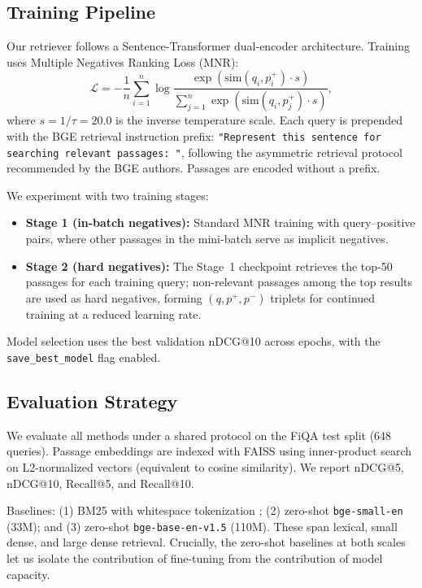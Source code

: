 \documentclass{article} %
\begin{document}
\subsection{Training Pipeline}

Our retriever follows a Sentence-Transformer dual-encoder architecture.
Training uses Multiple Negatives Ranking Loss (MNR):
\[
\mathcal{L}
=
-\frac{1}{n}\sum_{i=1}^{n}
\log
\frac{\exp(\mathrm{sim}(q_i, p_i^+) \cdot s)}
{\sum_{j=1}^{n}\exp(\mathrm{sim}(q_i, p_j^+) \cdot s)},
\]
where $s = 1/\tau = 20.0$ is the inverse temperature scale.
Each query is prepended with the BGE retrieval instruction prefix: \texttt{"Represent this sentence for searching relevant passages: "}, following the asymmetric retrieval protocol recommended by the BGE authors.
Passages are encoded without a prefix.

We experiment with two training stages:
\begin{itemize}
    \item \textbf{Stage 1 (in-batch negatives):} Standard MNR training with query--positive pairs, where other passages in the mini-batch serve as implicit negatives.
    \item \textbf{Stage 2 (hard negatives):} The Stage~1 checkpoint retrieves the top-50 passages for each training query; non-relevant passages among the top results are used as hard negatives, forming $(q, p^+, p^-)$ triplets for continued training at a reduced learning rate.
\end{itemize}

Model selection uses the best validation nDCG@10 across epochs, with the \texttt{save\_best\_model} flag enabled.

\subsection{Evaluation Strategy}

We evaluate all methods under a shared protocol on the FiQA test split (648 queries).
Passage embeddings are indexed with FAISS \citep{douze2025faiss} using inner-product search on L2-normalized vectors (equivalent to cosine similarity).
We report nDCG@5, nDCG@10, Recall@5, and Recall@10.

Baselines: (1) BM25 with whitespace tokenization \citep{thakur2021beir}; (2) zero-shot \texttt{bge-small-en} (33M); and (3) zero-shot \texttt{bge-base-en-v1.5} (110M).
These span lexical, small dense, and large dense retrieval. Crucially, the zero-shot baselines at both scales let us isolate the contribution of fine-tuning from the contribution of model capacity.
\end{document}
